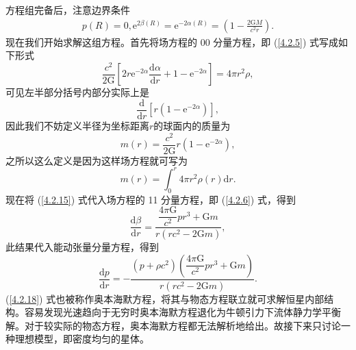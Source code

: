 \documentclass[11pt, a4paper, oneside, onecolumn]{ctexart}
\numberwithin{equation}{subsection}
\begin{document}
方程组完备后，注意边界条件
\begin{align}
p\left(R\right)=0,\mathrm{e}^{2\beta\left(R\right)}=\mathrm{e}^{-2\alpha\left(R\right)}=\left(1-\frac{2\mathrm{G}M}{c^{2}r}\right).
\end{align}
现在我们开始求解这组方程。首先将场方程的 00 分量方程，即 (\ref{4.2.5}) 式写成如下形式
\begin{equation}
\frac{c^{2}}{2\mathrm{G}}\left[2r\mathrm{e}^{-2\alpha}\frac{\mathrm{d}\alpha}{\mathrm{d}r}+1-\mathrm{e}^{-2\alpha}\right]=4\pi r^{2}\rho,
\end{equation}
可见左半部分括号内部分实际上是
\begin{equation}
\frac{\mathrm{d}}{\mathrm{d}r}\left[r\left(1-\mathrm{e}^{-2\alpha}\right)\right],
\end{equation}
因此我们不妨定义半径为坐标距离$r$的球面内的质量为
\begin{equation}
m\left(r\right)=\frac{c^{2}}{2\mathrm{G}}r\left(1-\mathrm{e}^{-2\alpha}\right),\label{4.2.15}
\end{equation}
之所以这么定义是因为这样场方程就可写为
\begin{equation}
m\left(r\right)=\int_{0}^{r}4\pi r^{2}\rho\left(r\right)\mathrm{d}r.
\end{equation}
现在将 (\ref{4.2.15}) 式代入场方程的 11 分量方程，即 (\ref{4.2.6}) 式，得到
\begin{equation}
\frac{\mathrm{d}\beta}{\mathrm{d}r}=\frac{\dfrac{4\pi\mathrm{G}}{c^{2}}pr^{3}+\mathrm{G}m}{r\left(rc^{2}-2\mathrm{G}m\right)},\label{4.2.17}
\end{equation}
此结果代入能动张量分量方程，得到
\begin{equation}
\frac{\mathrm{d}p}{\mathrm{d}r}=-\frac{\left(p+\rho c^{2}\right)\left(\dfrac{4\pi\mathrm{G}}{c^{2}}pr^{3}+\mathrm{G}m\right)}{r\left(rc^{2}-2\mathrm{G}m\right)}.\label{4.2.18}
\end{equation}
(\ref{4.2.18}) 式也被称作奥本海默方程，将其与物态方程联立就可求解恒星内部结构。容易发现光速趋向于无穷时奥本海默方程退化为牛顿引力下流体静力学平衡解。对于较实际的物态方程，奥本海默方程都无法解析地给出。故接下来只讨论一种理想模型，即密度均匀的星体。
\end{document}
